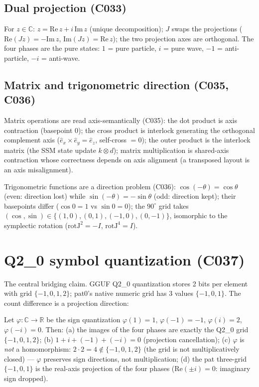 \documentclass[sigplan,10pt,anonymous,review]{acmart}
\begin{document}
\subsection{Dual projection (C033)}

\begin{theorem}[C033]
For $z \in \mathbb C$: $z = \mathrm{Re}\,z + i\,\mathrm{Im}\,z$ (unique
decomposition); $J$ swaps the projections ($\mathrm{Re}(Jz) = -\mathrm{Im}\,z$,
$\mathrm{Im}(Jz) = \mathrm{Re}\,z$); the two projection axes are orthogonal.
The four phases are the pure states: $1$ = pure particle, $i$ = pure wave,
$-1$ = anti-particle, $-i$ = anti-wave.
\end{theorem}

\subsection{Matrix and trigonometric direction (C035, C036)}

Matrix operations are read axis-semantically (C035): the dot product is axis
contraction (basepoint $0$); the cross product is interlock generating the
orthogonal complement axis ($\hat e_x \times \hat e_y = \hat e_z$, self-cross $=0$);
the outer product is the interlock matrix (the SSM state update $k\otimes d$);
matrix multiplication is shared-axis contraction whose correctness depends on
axis alignment (a transposed layout is an axis misalignment).

Trigonometric functions are a direction problem (C036):
$\cos(-\theta) = \cos\theta$ (even: direction lost) while
$\sin(-\theta) = -\sin\theta$ (odd: direction kept); their basepoints differ
($\cos 0 = 1$ vs $\sin 0 = 0$); the $90^\circ$ grid takes
$(\cos,\sin) \in \{(1,0),(0,1),(-1,0),(0,-1)\}$, isomorphic to the symplectic
rotation ($\mathrm{rotJ}^2 = -I$, $\mathrm{rotJ}^4 = I$).

\section{Q2\_0 symbol quantization (C037)}

The central bridging claim. GGUF Q2\_0 quantization stores 2 bits per element
with grid $\{-1, 0, 1, 2\}$; pat0's native numeric grid has 3 values
$\{-1,0,1\}$. The count difference is a projection direction:

\begin{theorem}[C037]
Let $\varphi : \mathbb C \to \mathbb R$ be the sign quantization
$\varphi(1)=1$, $\varphi(-1)=-1$, $\varphi(i)=2$, $\varphi(-i)=0$. Then:
(a) the images of the four phases are exactly the Q2\_0 grid
$\{-1,0,1,2\}$; (b) $1 + i + (-1) + (-i) = 0$ (projection cancellation);
(c) $\varphi$ is \emph{not} a homomorphism: $2\cdot 2 = 4 \notin \{-1,0,1,2\}$
(the grid is not multiplicatively closed) --- $\varphi$ preserves sign
directions, not multiplication; (d) the pat three-grid $\{-1,0,1\}$ is the
real-axis projection of the four phases ($\mathrm{Re}(\pm i) = 0$: imaginary
sign dropped).
\end{theorem}
\end{document}
